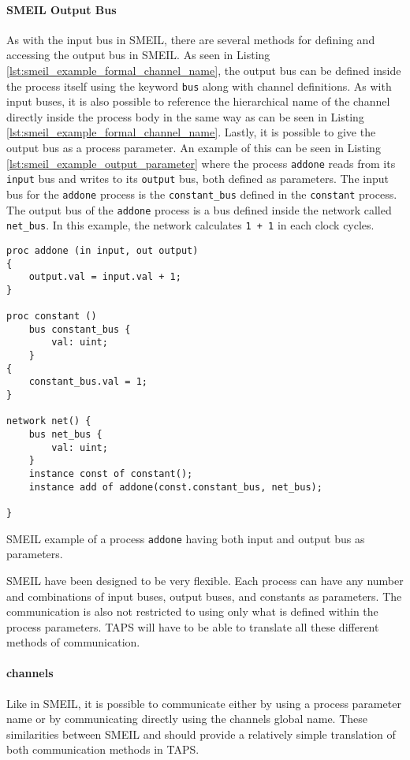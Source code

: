 \paragraph{SMEIL Output Bus}
As with the input bus in SMEIL, there are several methods for defining and accessing the output bus in SMEIL.
As seen in Listing \ref{lst:smeil_example_formal_channel_name}, the output bus can be defined inside the process itself using the keyword \texttt{bus} along with channel definitions. As with input buses, it is also possible to reference the hierarchical name of the channel directly inside the process body in the same way as can be seen in Listing \ref{lst:smeil_example_formal_channel_name}. Lastly, it is possible to give the output bus as a process parameter.
An example of this can be seen in Listing \ref{lst:smeil_example_output_parameter} where the process \texttt{addone} reads from its \texttt{input} bus and writes to its \texttt{output} bus, both defined as parameters. The input bus for the \texttt{addone} process is the \texttt{constant\_bus} defined in the \texttt{constant} process. The output bus of the \texttt{addone} process is a bus defined inside the network called \texttt{net\_bus}. In this example, the network calculates \texttt{1 + 1} in each clock cycles.
\begin{listing}
\begin{verbatim}
proc addone (in input, out output)
{
    output.val = input.val + 1;
}

proc constant ()
    bus constant_bus {
        val: uint;
    }
{
    constant_bus.val = 1;
}

network net() {
    bus net_bus {
        val: uint;
    }
    instance const of constant();
    instance add of addone(const.constant_bus, net_bus);

}
\end{verbatim}
\caption{SMEIL example of a process \texttt{addone} having both input and output bus as parameters.}
\label{lst:smeil_example_output_parameter}
\end{listing}

SMEIL have been designed to be very flexible. Each process can have any number and combinations of input buses, output buses, and constants as parameters. The communication is also not restricted to using only what is defined within the process parameters. TAPS will have to be able to translate all these different methods of communication.

\paragraph{\cspm{} channels}
Like in SMEIL, it is possible to communicate either by using a process parameter name or by communicating directly using the channels global name. These similarities between SMEIL and \cspm{} should provide a relatively simple translation of both communication methods in TAPS.\\

